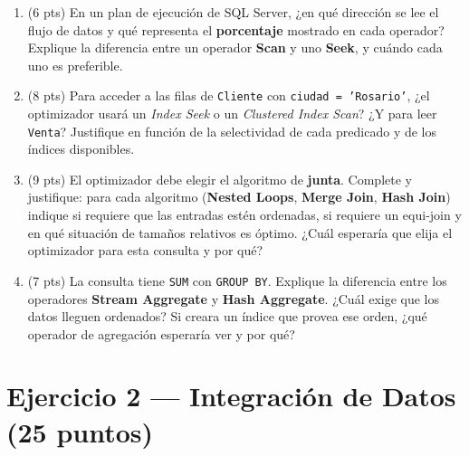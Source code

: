 \documentclass[11pt,a4paper]{article}
\begin{document}
\begin{enumerate}
  \item (6 pts) En un plan de ejecución de SQL Server, ¿en qué dirección se lee el flujo de datos y qué representa el \textbf{porcentaje} mostrado en cada operador? Explique la diferencia entre un operador \textbf{Scan} y uno \textbf{Seek}, y cuándo cada uno es preferible.

  \vspace{4cm}

  \item (8 pts) Para acceder a las filas de \texttt{Cliente} con \texttt{ciudad = 'Rosario'}, ¿el optimizador usará un \textit{Index Seek} o un \textit{Clustered Index Scan}? ¿Y para leer \texttt{Venta}? Justifique en función de la selectividad de cada predicado y de los índices disponibles.

  \vspace{4.5cm}

  \item (9 pts) El optimizador debe elegir el algoritmo de \textbf{junta}. Complete y justifique: para cada algoritmo (\textbf{Nested Loops}, \textbf{Merge Join}, \textbf{Hash Join}) indique si requiere que las entradas estén ordenadas, si requiere un equi-join y en qué situación de tamaños relativos es óptimo. ¿Cuál esperaría que elija el optimizador para esta consulta y por qué?

  \vspace{6cm}

  \item (7 pts) La consulta tiene \texttt{SUM} con \texttt{GROUP BY}. Explique la diferencia entre los operadores \textbf{Stream Aggregate} y \textbf{Hash Aggregate}. ¿Cuál exige que los datos lleguen ordenados? Si creara un índice que provea ese orden, ¿qué operador de agregación esperaría ver y por qué?

  \vspace{4.5cm}
\end{enumerate}

\newpage

\section*{Ejercicio 2 — Integración de Datos \hfill\normalfont(25 puntos)}
\end{document}

